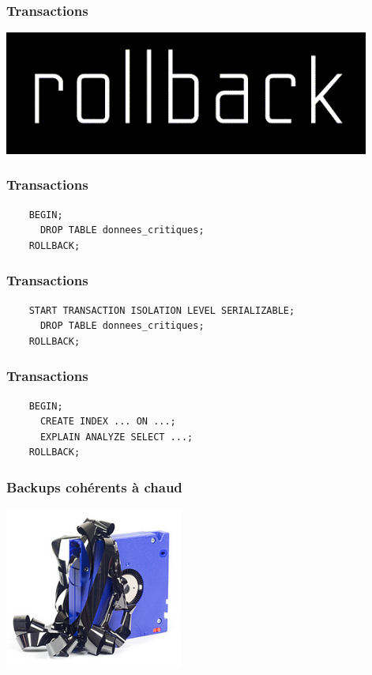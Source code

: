 \documentclass{beamer}
\begin{document}
\begin{frame}
  \frametitle{Transactions}

  \begin{center}
    \includegraphics[height=1.6in]{rollback-wordmark.png}
  \end{center}
\end{frame}

\begin{frame}[fragile]
  \frametitle{Transactions}

  \begin{verbatim}
    BEGIN;
      DROP TABLE donnees_critiques;
    ROLLBACK;
  \end{verbatim}
\end{frame}

\begin{frame}[fragile]
  \frametitle{Transactions}

  \begin{verbatim}
    START TRANSACTION ISOLATION LEVEL SERIALIZABLE;
      DROP TABLE donnees_critiques;
    ROLLBACK;
  \end{verbatim}
\end{frame}

\begin{frame}[fragile]
  \frametitle{Transactions}

  \begin{verbatim}
    BEGIN;
      CREATE INDEX ... ON ...;
      EXPLAIN ANALYZE SELECT ...;
    ROLLBACK;
  \end{verbatim}
\end{frame}

\begin{frame}
  \frametitle{Backups cohérents à chaud}

  \begin{center}
    \includegraphics[height=2.1in]{online-backup.jpg}
  \end{center}
\end{frame}
\end{document}

